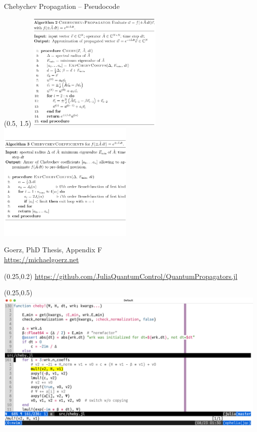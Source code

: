 \documentclass[compress, aspectratio=169]{beamer}
\begin{document}
\begin{frame}{Chebychev Propagation – Pseudocode}
  \begin{textblock}{15}(0.5, 1.5)
    \includegraphics[width=0.49\textwidth]{images/chebyalg1}
    \includegraphics[width=0.49\textwidth]{images/chebyalg2}
    \par
    {\footnotesize
    \vspace{-7mm}
    \hfill
    Goerz, PhD Thesis, Appendix F\\
    \hfill
    \url{https://michaelgoerz.net}
    }
  \end{textblock}
\end{frame}

\begin{frame}
  \begin{textblock}{15.5}(0.25,0.2)
    {\footnotesize
      \url{https://github.com/JuliaQuantumControl/QuantumPropagators.jl}
    }
  \end{textblock}
  \begin{textblock}{15.5}(0.25,0.5)
    \includegraphics[width=\textwidth]{images/cheby_implementation}
  \end{textblock}
\end{frame}
\end{document}
